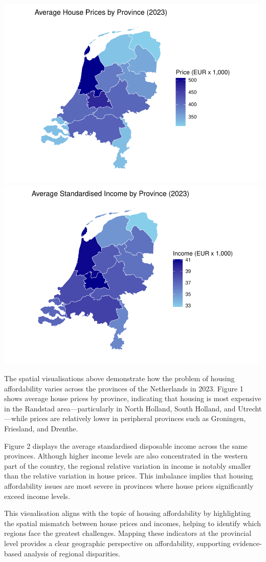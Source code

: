 \documentclass[
]{article}
\begin{document}
\includegraphics[width=0.52\linewidth,height=0.3\textheight]{r.markdown-group-6_files/figure-latex/visualise spatial variation-1}
\includegraphics[width=0.52\linewidth,height=0.3\textheight]{r.markdown-group-6_files/figure-latex/visualise spatial variation-2}

The spatial visualisations above demonstrate how the problem of housing
affordability varies across the provinces of the Netherlands in 2023.
Figure 1 shows average house prices by province, indicating that housing
is most expensive in the Randstad area---particularly in North Holland,
South Holland, and Utrecht---while prices are relatively lower in
peripheral provinces such as Groningen, Friesland, and Drenthe.

Figure 2 displays the average standardised disposable income across the
same provinces. Although higher income levels are also concentrated in
the western part of the country, the regional relative variation in
income is notably smaller than the relative variation in house prices.
This imbalance implies that housing affordability issues are most severe
in provinces where house prices significantly exceed income levels.

This visualisation aligns with the topic of housing affordability by
highlighting the spatial mismatch between house prices and incomes,
helping to identify which regions face the greatest challenges. Mapping
these indicators at the provincial level provides a clear geographic
perspective on affordability, supporting evidence-based analysis of
regional disparities.
\end{document}
